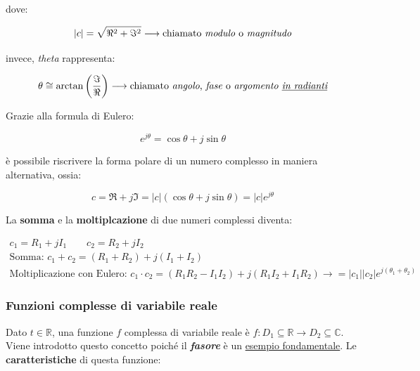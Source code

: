\documentclass[a4paper]{article}
\begin{document}
	\noindent
	dove:
	
	\begin{equation*}
		|c| = \sqrt{\Re^2 + \Im^2} \longrightarrow \text{chiamato \emph{modulo} o \emph{magnitudo}}
	\end{equation*}

	\noindent
	invece, \emph{theta} rappresenta:
	
	\begin{equation*}
		\theta \cong \arctan{\left(\dfrac{\Im}{\Re}\right)} \longrightarrow \text{chiamato \emph{angolo}, \emph{fase} o \emph{argomento \underline{in radianti}}}
	\end{equation*}

	Grazie alla formula di Eulero:
	
	\begin{equation*}
		e^{j \theta} = \cos{\theta} + j \sin{\theta}
	\end{equation*}
	
	\noindent
	è possibile riscrivere la forma polare di un numero complesso in maniera alternativa, ossia:
	
	\begin{equation*}
		c = \Re + j \Im = |c|\left(\cos{\theta} + j \sin{\theta}\right) = |c| e^{j \theta}
	\end{equation*}

	La \textbf{somma} e la \textbf{moltiplcazione} di due numeri complessi diventa:
	
	\begin{gather*}
		c_1 = R_1 + j I_1 \hspace{2em} c_2 = R_2 + j I_2 \\
		\text{Somma: } c_1 + c_2 = \left(R_1 + R_2\right) + j \left(I_1 + I_2\right) \\
		\text{Moltiplicazione con Eulero: } c_1\cdot c_2 = \left(R_1 R_2 - I_1 I_2\right) + j \left(R_1 I_2 + I_1 R_2\right) \longrightarrow = |c_1| |c_2| e^{j\left(\theta_1 + \theta_2\right)}
	\end{gather*}

	\newpage

	\subsubsection{Funzioni complesse di variabile reale}

	Dato $t \in \mathbb{R}$, una funzione $f$ complessa di variabile reale è $f: D_1 \subseteq \mathbb{R} \rightarrow D_2 \subseteq \mathbb{C}$. Viene introdotto questo concetto poiché il \textbf{\emph{fasore}} è un \underline{esempio fondamentale}. Le \textbf{caratteristiche} di questa funzione:
	
\end{document}
